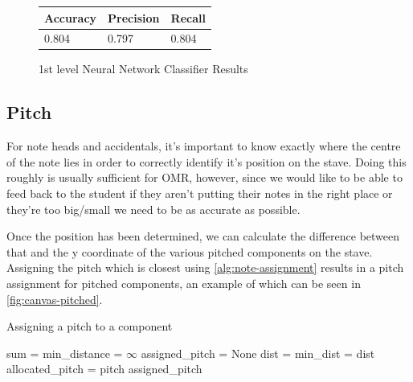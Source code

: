\begin{figure}[H]
  \vspace{0.8cm}

  \begin{subtable}[b]{.4\linewidth}
    \begin{tabularx}{\linewidth}{lll}
      \toprule
      Accuracy & Precision & Recall \\
      \midrule
      0.804 & 0.797 & 0.804 \\
      \bottomrule
    \end{tabularx}
  \end{subtable}

  \vspace{0.4cm}

  \caption{1st level Neural Network Classifier Results}
  \label{fig:nn-classification-data}
\end{figure}

\subsection{Pitch}
\label{sec:pitch-identification}

For note heads and accidentals, it's important to know exactly where the centre of the note lies in order to correctly identify it's position on the stave. Doing this roughly is usually sufficient for OMR, however, since we would like to be able to feed back to the student if they aren't putting their notes in the right place or they're too big/small we need to be as accurate as possible.

Once the position has been determined, we can calculate the difference between that and the y coordinate of the various pitched components on the stave. Assigning the pitch which is closest using \cref{alg:note-assignment} results in a pitch assignment for pitched components, an example of which can be seen in \cref{fig:canvas-pitched}.

\begin{algorithm}[H]
\caption{Assigning a pitch to a component}
\label{alg:note-assignment}
\begin{algorithmic}[1]
    \State sum = 
    \State min\_distance = $\infty$
    \State assigned\_pitch = None
      \State dist = 
        \State min\_dist = dist
        \State allocated\_pitch = pitch
      \EndIf
	\EndFor
	\Return assigned\_pitch
\EndProcedure
\end{algorithmic}
\end{algorithm}

